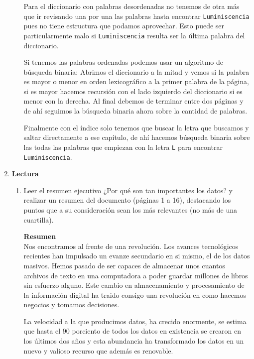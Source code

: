 \documentclass[12pt,a4paper]{article}
\begin{document}
\begin{enumerate}
\begin{enumerate}
				Para el diccionario con palabras desordenadas no tenemos de otra más que ir revisando una por una
				las palabras hasta encontrar \texttt{Luminiscencia} pues no tiene estructura que podamos aprovechar.
				Esto puede ser particularmente malo si \texttt{Luminiscencia} resulta ser la última palabra del diccionario.

				Si tenemos las palabras ordenadas podemos usar un algoritmo de búsqueda binaria:
				Abrimos el diccionario a la mitad y vemos si la palabra es mayor o menor en orden
				lexicográfico a la primer palabra de la página, si es mayor hacemos recursión con el lado izquierdo
				del diccionario si es menor con la derecha.
				Al final debemos de terminar entre dos páginas y de ahí seguimos la búsqueda binaria ahora
				sobre la cantidad de palabras.

				Finalmente con el índice solo tenemos que buscar la letra que buscamos y saltar directamente a
				ese capítulo, de ahí hacemos búsqueda binaria sobre las todas las palabras que
				empiezan con la letra \texttt{L} para encontrar \texttt{Luminiscencia}.

		\end{enumerate}

	\item \textbf{Lectura}
		\begin{enumerate}
			\item Leer el resumen ejecutivo ¿Por qué son tan importantes los datos? y realizar un resumen del documento
				(páginas 1 a 16), destacando los puntos que a su consideración sean los más relevantes (no más de
				una cuartilla).

				\textbf{Resumen}\\
				Nos encontramos al frente de una revolución.
				Los avances tecnológicos recientes han impulsado
				un evanze secundario en si mismo, el de los datos masivos.
				Hemos pasado de ser capaces de almacenar unos cuantos
				archivos de texto en una computadora a poder guardar
				millones de libros sin esfuerzo alguno.
				Este cambio en almacenamiento y procesamiento
				de la información digital ha traido consigo
				una revolución en como hacemos negocios y tomamos decisiones.

				La velocidad a la que producimos datos, ha crecido
				enormente, se estima que hasta el 90 porciento
				de todos los datos en existencia se crearon
				en los últimos dos años y esta abundancia
				ha transformado los datos en un nuevo y valioso
				recurso que además es renovable.


\end{enumerate}
\end{enumerate}
\end{document}
